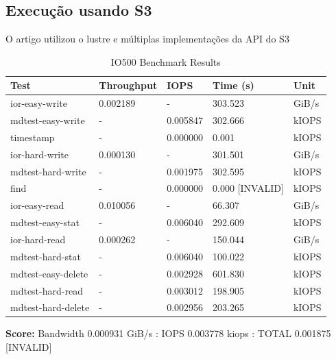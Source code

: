 \documentclass[article,a4paper,12pt,brazil,sumario=tradicional]{abntex2}
\begin{document}
\subsection{Execução usando S3}
O artigo utilizou o lustre e múltiplas implementações da API do S3
\begin{table}[htb]
	\centering
	\begin{tabular}{|l|l|l|l|l|}
		\hline
		\rowcolor[HTML]{EFEFEF}
		\textbf{Test}          & \textbf{Throughput}        & \textbf{IOPS}         & \textbf{Time (s)} & \textbf{Unit} \\ \hline
		ior-easy-write         & 0.002189                    & -                    & 303.523           & GiB/s         \\ \hline
		mdtest-easy-write      & -                          & 0.005847             & 302.666           & kIOPS         \\ \hline
		timestamp              & -                          & 0.000000             & 0.001             & kIOPS         \\ \hline
		ior-hard-write         & 0.000130                    & -                    & 301.501           & GiB/s         \\ \hline
		mdtest-hard-write      & -                          & 0.001975             & 302.595           & kIOPS         \\ \hline
		find                   & -                          & 0.000000             & 0.000 [INVALID]   & kIOPS         \\ \hline
		ior-easy-read          & 0.010056                    & -                    & 66.307            & GiB/s         \\ \hline
		mdtest-easy-stat       & -                          & 0.006040             & 292.609           & kIOPS         \\ \hline
		ior-hard-read          & 0.000262                    & -                    & 150.044           & GiB/s         \\ \hline
		mdtest-hard-stat       & -                          & 0.006040             & 100.022           & kIOPS         \\ \hline
		mdtest-easy-delete     & -                          & 0.002928             & 601.830           & kIOPS         \\ \hline
		mdtest-hard-read       & -                          & 0.003012             & 198.905           & kIOPS         \\ \hline
		mdtest-hard-delete     & -                          & 0.002956             & 203.265           & kIOPS         \\ \hline
	\end{tabular}
	\caption{IO500 Benchmark Results}
	\label{tab:io500-results}
	\textbf{Score:} Bandwidth 0.000931 GiB/s : IOPS 0.003778 kiops : TOTAL 0.001875 [INVALID]
\end{table}
\end{document}
